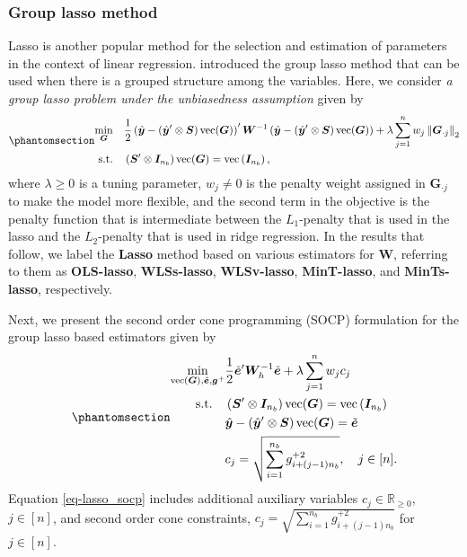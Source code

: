 \documentclass[
  11pt]{article}
\theoremstyle{plain}
\theoremstyle{remark}
\begin{document}
\subsubsection*{Group lasso method}\label{group-lasso-method}

Lasso is another popular method for the selection and estimation of
parameters in the context of linear regression. \citet{Yuan2006-mw}
introduced the group lasso method that can be used when there is a
grouped structure among the variables. Here, we consider \emph{a group
lasso problem under the unbiasedness assumption} given by
\begin{equation}\phantomsection\label{eq-lasso}{
\begin{aligned}
\min_{\bm{G}} \quad & \frac{1}{2}\left(\hat{\bm{y}}-\left(\hat{\bm{y}}^{\prime} \otimes \bm{S}\right) \operatorname{vec}(\bm{G})\right)^{\prime} \bm{W}^{-1}\left(\hat{\bm{y}}-\left(\hat{\bm{y}}^{\prime} \otimes \bm{S}\right) \operatorname{vec}(\bm{G})\right) + \lambda \sum_{j=1}^n w_j \left\|\bm{G}_{\cdot j}\right\|_2 \\
\text{s.t.} \quad & \left(\bm{S}^{\prime} \otimes \bm{I}_{n_b}\right) \operatorname{vec}(\bm{G})=\operatorname{vec}\left(\bm{I}_{n_b}\right),
\end{aligned}
}\end{equation} where \(\lambda \geq 0\) is a tuning parameter,
\(w_j \neq 0\) is the penalty weight assigned in \(\bm{G}_{\cdot j}\) to
make the model more flexible, and the second term in the objective is
the penalty function that is intermediate between the \(L_1\)-penalty
that is used in the lasso and the \(L_2\)-penalty that is used in ridge
regression. In the results that follow, we label the \textbf{Lasso}
method based on various estimators for \(\bm{W}\), referring to them as
\textbf{OLS-lasso}, \textbf{WLSs-lasso}, \textbf{WLSv-lasso},
\textbf{MinT-lasso}, and \textbf{MinTs-lasso}, respectively.

Next, we present the second order cone programming (SOCP) formulation
for the group lasso based estimators given by
\begin{equation}\phantomsection\label{eq-lasso_socp}{
\begin{aligned}
\min_{\operatorname{vec}(\bm{G}), \check{\bm{e}}, \bm{g}^{+}} & \frac{1}{2}\check{\bm{e}}^{\prime} \bm{W}_h^{-1}\check{\bm{e}} + \lambda \sum_{j=1}^n w_j c_j \\
\text{s.t.} \quad & \left(\bm{S}^{\prime} \otimes \bm{I}_{n_b}\right) \operatorname{vec}(\bm{G})=\operatorname{vec}\left(\bm{I}_{n_b}\right) \\
& \hat{\bm{y}}-\left(\hat{\bm{y}}^{\prime} \otimes \bm{S}\right) \operatorname{vec}(\bm{G}) = \check{\bm{e}} \\
& c_j = \sqrt{\sum_{i=1}^{n_b} g_{i + (j-1) n_b}^{+2}}, \quad j \in[n].
\end{aligned}
}\end{equation} Equation \eqref{eq-lasso_socp} includes additional
auxiliary variables \(c_j \in \mathbb{R}_{\geq 0}\), \(j \in [n]\), and
second order cone constraints,
\(c_j = \sqrt{\sum_{i=1}^{n_b} g_{i + (j-1) n_b}^{+2}}\) for
\(j \in[n]\).
\end{document}
